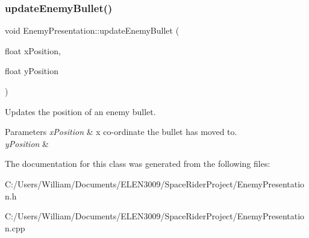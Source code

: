 \subsubsection{\texorpdfstring{update\+Enemy\+Bullet()}{updateEnemyBullet()}}
{\footnotesize\ttfamily void Enemy\+Presentation\+::update\+Enemy\+Bullet (\begin{DoxyParamCaption}\item[{float}]{x\+Position,  }\item[{float}]{y\+Position }\end{DoxyParamCaption})}



Updates the position of an enemy bullet. 


\begin{DoxyParams}{Parameters}
{\em x\+Position} & x co-\/ordinate the bullet has moved to. \\
\hline
{\em y\+Position} & \\
\hline
\end{DoxyParams}


The documentation for this class was generated from the following files\+:\begin{DoxyCompactItemize}
\item 
C\+:/\+Users/\+William/\+Documents/\+E\+L\+E\+N3009/\+Space\+Rider\+Project/Enemy\+Presentation.\+h\item 
C\+:/\+Users/\+William/\+Documents/\+E\+L\+E\+N3009/\+Space\+Rider\+Project/Enemy\+Presentation.\+cpp\end{DoxyCompactItemize}
